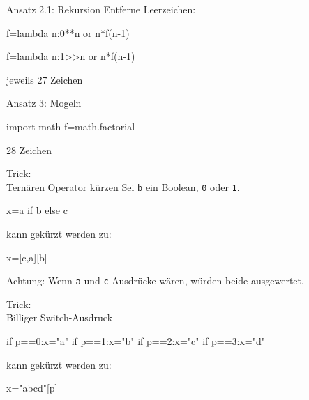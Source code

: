 \documentclass[xcolor=dvipsnames, aspectratio=43, 14pt]{beamer}
\begin{document}
\begin{frame}[fragile]{Ansatz 2.1: Rekursion}
	Entferne Leerzeichen:
	
	\vfill
	
	\begin{python3code}
	f=lambda n:0**n or n*f(n-1)
	\end{python3code}
	
	\vfill
	
	\begin{python3code}
	f=lambda n:1>>n or n*f(n-1)
	\end{python3code}

	
	\vfill
	
	jeweils 27 Zeichen
\end{frame}

\begin{frame}[fragile]{Ansatz 3: Mogeln}
	\begin{python3code}
	import math
	f=math.factorial
	\end{python3code}
	
	\vfill
	
	28 Zeichen
\end{frame}

\begin{frame}[fragile]{Trick:\\ Ternären Operator kürzen}
	Sei \texttt{b} ein Boolean, \texttt{0} oder \texttt{1}.
	
	\vfill
	
	\begin{python3code}
	x=a if b else c
	\end{python3code}
	
	\vfill
	
	kann gekürzt werden zu:
	
	\vfill
	
	\begin{python3code}
	x=[c,a][b]
	\end{python3code}
	
	\pause
	
	Achtung: Wenn \texttt{a} und \texttt{c} Ausdrücke wären, würden beide ausgewertet.
\end{frame}

\begin{frame}[fragile]{Trick:\\ Billiger Switch-Ausdruck}
	\begin{python3code}
	if p==0:x="a"
	if p==1:x="b"
	if p==2:x="c"
	if p==3:x="d"
	\end{python3code}
	
	\vfill
	
	kann gekürzt werden zu:
	
	\vfill
	
	\begin{python3code}
	x="abcd"[p]
	\end{python3code}
\end{frame}
\end{document}

